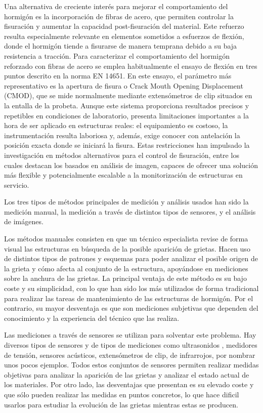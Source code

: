 Una alternativa de creciente interés para mejorar el comportamiento del hormigón es la incorporación de fibras de acero, que permiten controlar la fisuración y aumentar la capacidad post-fisuración del material. Este refuerzo resulta especialmente relevante en elementos sometidos a esfuerzos de flexión, donde el hormigón tiende a fisurarse de manera temprana debido a su baja resistencia a tracción. Para caracterizar el comportamiento del hormigón reforzado con fibras de acero se emplea habitualmente el ensayo de flexión en tres puntos descrito en la norma EN 14651. En este ensayo, el parámetro más representativo es la apertura de fisura o Crack Mouth Opening Displacement (CMOD), que se mide normalmente mediante extensómetros de clip situados en la entalla de la probeta. Aunque este sistema proporciona resultados precisos y repetibles en condiciones de laboratorio, presenta limitaciones importantes a la hora de ser aplicado en estructuras reales: el equipamiento es costoso, la instrumentación resulta laboriosa y, además, exige conocer con antelación la posición exacta donde se iniciará la fisura. Estas restricciones han impulsado la investigación en métodos alternativos para el control de fisuración, entre los cuales destacan los basados en análisis de imagen, capaces de ofrecer una solución más flexible y potencialmente escalable a la monitorización de estructuras en servicio.

Los tres tipos de métodos principales de medición y análisis usados han sido \cite{MenaAlonso2023} la medición manual, la medición a través de distintos tipos de sensores, y el análisis de imágenes.

Los métodos manuales consisten en que un técnico especialista revise de forma visual las estructuras en búsqueda de la posible aparición de grietas. Hacen uso de distintos tipos de patrones y esquemas para poder analizar el posible origen de la grieta y cómo afecta al conjunto de la estructura, apoyándose en mediciones sobre la anchura de las grietas. La principal ventaja de este método es su bajo coste y su simplicidad, con lo que han sido los más utilizados de forma tradicional para realizar las tareas de mantenimiento de las estructuras de hormigón. Por el contrario, su mayor desventaja es que son mediciones subjetivas que dependen del conocimiento y la experiencia del técnico que las realiza.

Las mediciones a través de sensores se utilizan para solventar este problema. Hay diversos tipos de sensores y de tipos de mediciones como ultrasonidos \cite{Lootens2020Continuous}, medidores de tensión, sensores acústicos, extensómetros de clip, de infrarrojos, por nombrar unos pocos ejemplos. Todos estos conjuntos de sensores permiten realizar medidas objetivas para analizar la aparición de las grietas y analizar el estado actual de los materiales. Por otro lado, las desventajas que presentan es su elevado coste y que sólo pueden realizar las medidas en puntos concretos, lo que hace dificil usarlos para estudiar la evolución de las grietas mientras estas se producen.

